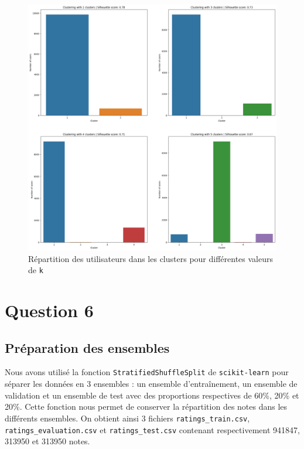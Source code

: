 \documentclass{article}
\begin{document}
\begin{figure}[ht]
  \centering
  \includegraphics[width=1\textwidth]{img/clusters_distribution.png}
  \caption{Répartition des utilisateurs dans les clusters pour différentes valeurs de \texttt{k}}
\end{figure}

\newpage
\section{Question 6}

\subsection{Préparation des ensembles}
Nous avons utilisé la fonction \texttt{StratifiedShuffleSplit} de \texttt{scikit-learn}
pour séparer les données en 3 ensembles : un ensemble d'entraînement, un ensemble
de validation et un ensemble de test avec des proportions respectives de 60\%,
20\% et 20\%.
\vskip 0.25cm
Cette fonction nous permet de conserver la répartition des notes dans les
différents ensembles.
\vskip 0.25cm
On obtient ainsi 3 fichiers \texttt{ratings\_train.csv}, \texttt{ratings\_evaluation.csv}
et \texttt{ratings\_test.csv} contenant respectivement 941847, 313950 et 313950 notes.
\end{document}
